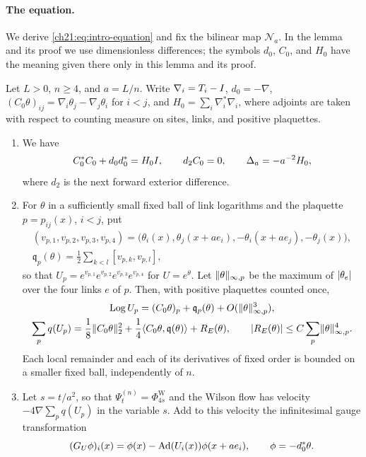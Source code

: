 \paragraph{The equation.}
We derive \eqref{ch21:eq:intro-equation} and fix the bilinear map $\mathcal N_a$. In the lemma and its proof we use dimensionless differences; the symbols $d_0$, $C_0$, and $H_0$ have the meaning given there only in this lemma and its proof.

\begin{lemma}\label{ch21:lem:wilson-local-algebra}
Let $L>0$, $n\ge4$, and $a=L/n$. Write $\nabla_i=T_i-I$, $d_0=-\nabla$, $(C_0\theta)_{ij}=\nabla_i\theta_j-\nabla_j\theta_i$ for $i<j$, and $H_0=\sum_i\nabla_i^*\nabla_i$, where adjoints are taken with respect to counting measure on sites, links, and positive plaquettes.
\begin{enumerate}
\item We have
\[
 C_0^*C_0+d_0d_0^*=H_0I,\qquad d_2C_0=0,\qquad\Delta_a=-a^{-2}H_0,
\]
where $d_2$ is the next forward exterior difference.
\item For $\theta$ in a sufficiently small fixed ball of link logarithms and the plaquette $p=p_{ij}(x)$, $i<j$, put
\[
 \begin{gathered}
 (v_{p,1},v_{p,2},v_{p,3},v_{p,4})=\bigl(\theta_i(x),\theta_j(x+ae_i),-\theta_i(x+ae_j),-\theta_j(x)\bigr),\\
 \mathfrak q_p(\theta)=\frac12\sum_{k<l}[v_{p,k},v_{p,l}],
 \end{gathered}
\]
so that $U_p=e^{v_{p,1}}e^{v_{p,2}}e^{v_{p,3}}e^{v_{p,4}}$ for $U=e^\theta$. Let $\lVert \theta\rVert_{\infty,p}$ be the maximum of $\lvert \theta_e\rvert$ over the four links $e$ of $p$. Then, with positive plaquettes counted once,
\[
 \begin{gathered}
 \operatorname{Log} U_p=(C_0\theta)_p+\mathfrak q_p(\theta)+O(\lVert \theta\rVert_{\infty,p}^3),\\
 \sum_pq(U_p)=\frac18\lVert C_0\theta\rVert_2^2+\frac14\langle C_0\theta,\mathfrak q(\theta)\rangle+R_E(\theta),\qquad
 \lvert R_E(\theta)\rvert\le C\sum_p\lVert \theta\rVert_{\infty,p}^4 .
 \end{gathered}
\]
Each local remainder and each of its derivatives of fixed order is bounded on a smaller fixed ball, independently of $n$.
\item Let $s=t/a^2$, so that $\Psi^{(n)}_t=\Phi^{\mathrm W}_{4s}$ and the Wilson flow has velocity $-4\nabla\sum_pq(U_p)$ in the variable $s$. Add to this velocity the infinitesimal gauge transformation
\[
 (G_U\phi)_i(x)=\phi(x)-\operatorname{Ad}(U_i(x))\phi(x+ae_i),\qquad \phi=-d_0^*\theta .
\]
\end{enumerate}
\end{lemma}
